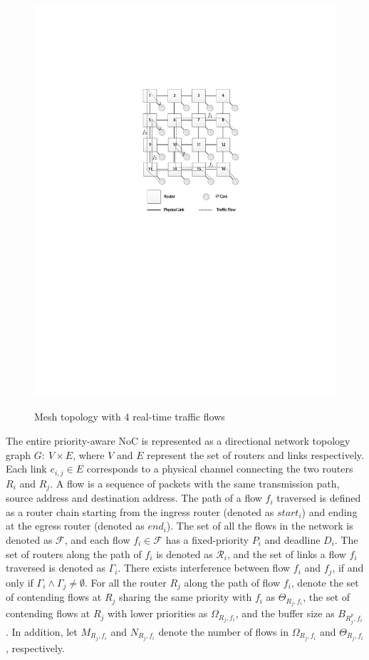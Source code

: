 \documentclass[10pt,journal]{IEEEtran}
\begin{document}
\begin{figure}
  \centering
  \includegraphics[scale=0.9]{figures/mesh.pdf}\\
  \caption{Mesh topology with 4 real-time traffic flows}\label{topology}
\end{figure}

The entire priority-aware NoC is represented as a directional network topology graph $G:\ V\times E$, where $V$ and $E$ represent the set of routers and links respectively. Each link $e_{i,j}\in E$ corresponds to a physical channel connecting the two routers $R_i$ and $R_j$. A flow is a sequence of packets with the same transmission path, source address and destination address. The path of a flow $f_i$ traversed is defined as a router chain starting from the ingress router (denoted as $start_i$) and ending at the egress router (denoted as $end_i$). The set of all the flows in the network is denoted as $\mathcal{F}$, and each flow $f_i\in\mathcal{F}$ has a fixed-priority $P_i$ and deadline $D_i$. The set of routers along the path of $f_i$ is denoted as $\mathcal{R}_i$, and the set of links a flow $f_i$ traversed is denoted as $\Gamma_i$. There exists interference between flow $f_i$ and $f_j$, if and only if $\Gamma_i\wedge\Gamma_j\neq\emptyset$. For all the router $R_j$ along the path of flow $f_i$, denote the set of contending flows at $R_j$ sharing the same priority with $f_i$ as $\Theta_{R_j,f_i}$, the set of contending flows at $R_j$ with lower priorities as $\Omega_{R_j,f_i}$, and the buffer size as $B_{R_j^{p},f_i}$. In addition, let $M_{R_j,f_i}$ and $N_{R_j,f_i}$ denote the number of flows in $\Omega_{R_j,f_i}$ and $\Theta_{R_j,f_i}$, respectively.
\end{document}
